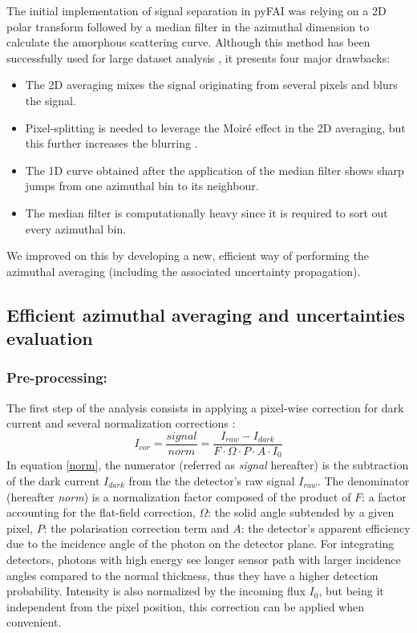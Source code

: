 \documentclass[preprint]{iucr}              %
\begin{document}
The initial implementation of signal separation in pyFAI \cite{pdj2013} was relying on a 2D polar transform followed by a median filter in the azimuthal dimension to calculate the amorphous scattering curve.
Although this method has been successfully used for large dataset analysis \cite{brocades}, it presents four major drawbacks:
\begin{itemize}
\item The 2D averaging mixes the signal originating from several pixels and blurs the signal. 
\item Pixel-splitting is needed to leverage the Moiré effect in the 2D averaging, but this further increases the blurring \cite{moire}. 
\item The 1D curve obtained after the application of the median filter shows sharp jumps from one azimuthal bin to its neighbour.
\item The median filter is computationally heavy since it is required to sort out every azimuthal bin.
\end{itemize}

We improved on this by developing a new, efficient way of performing the azimuthal averaging (including the associated uncertainty propagation). 

\subsection{Efficient azimuthal averaging and uncertainties evaluation}

\subsubsection{Pre-processing:}
The first step of the analysis consists in applying a pixel-wise correction for dark current and several normalization corrections \cite{pyfai_2020}:
\begin{equation}
\label{norm}
I_{cor} = \frac{signal}{norm}  = \frac{I_{raw} - I_{dark}}{F \cdot
\Omega \cdot P \cdot A \cdot I_0} 
\end{equation}
In  equation \ref{norm}, the numerator (referred as \textit{signal} hereafter) is the subtraction of the dark current $I_{dark}$ from the the detector's raw signal $I_{raw}$.
The denominator (hereafter \textit{norm}) is a normalization factor composed of the product of  $F$:  a factor accounting for the flat-field correction, $\Omega$: the solid angle subtended by a given pixel, $P$: the polarisation correction term and $A$: the detector's apparent efficiency due to the incidence angle of the photon on the detector plane. 
For integrating detectors, photons with high energy see longer sensor path with larger incidence angles compared to the normal thickness, thus they have a higher detection probability.
Intensity is also normalized by the incoming flux $I_0$, but being it independent from the pixel position, this correction can be applied when convenient.
\end{document}
